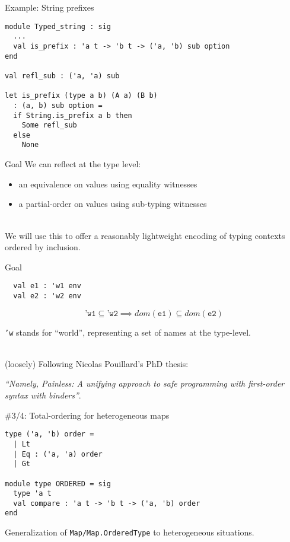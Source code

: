 \documentclass{beamer}          %
\begin{document}
\begin{frame}[fragile]{Example: String prefixes}

\begin{lstlisting}
module Typed_string : sig
  ...
  val is_prefix : 'a t -> 'b t -> ('a, 'b) sub option
end

val refl_sub : ('a, 'a) sub

let is_prefix (type a b) (A a) (B b)
  : (a, b) sub option =
  if String.is_prefix a b then
    Some refl_sub
  else
    None
\end{lstlisting}
\end{frame}

\begin{frame}{Goal}
  We can reflect at the type level:
  \begin{itemize}
    \item an equivalence on values using equality witnesses
    \item a partial-order on values using sub-typing witnesses
  \end{itemize}

  ~ \\

  We will use this to offer a reasonably lightweight encoding of
  typing contexts ordered by inclusion.
\end{frame}

\begin{frame}[fragile]{Goal}
  \begin{lstlisting}
  val e1 : 'w1 env
  val e2 : 'w2 env
  \end{lstlisting}
  $$
  \texttt{'w1} \subseteq \texttt{'w2} \implies dom(\texttt{e1}) \subseteq dom(\texttt{e2})
  $$

  \texttt{'w} stands for ``world'', representing a set of names at the type-level.

  ~ \\

  (loosely) Following Nicolas Pouillard's PhD thesis:

  {\em ``Namely, Painless: A unifying approach to safe programming with first-order syntax with binders''}.
\end{frame}

\begin{frame}[fragile]{\#3/4: Total-ordering for heterogeneous maps}
\begin{lstlisting}
type ('a, 'b) order =
  | Lt
  | Eq : ('a, 'a) order
  | Gt

module type ORDERED = sig
  type 'a t
  val compare : 'a t -> 'b t -> ('a, 'b) order
end
\end{lstlisting}

Generalization of \lstinline{Map/Map.OrderedType} to heterogeneous situations.
\end{frame}
\end{document}

